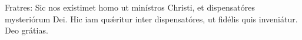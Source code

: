 Fratres: Sic nos exístimet homo ut minístros Christi, et dispensatóres mysteriórum Dei. Hic iam quǽritur inter dispensatóres, ut fidélis quis inveniátur. \rubric{\Rbar} Deo grátias.
